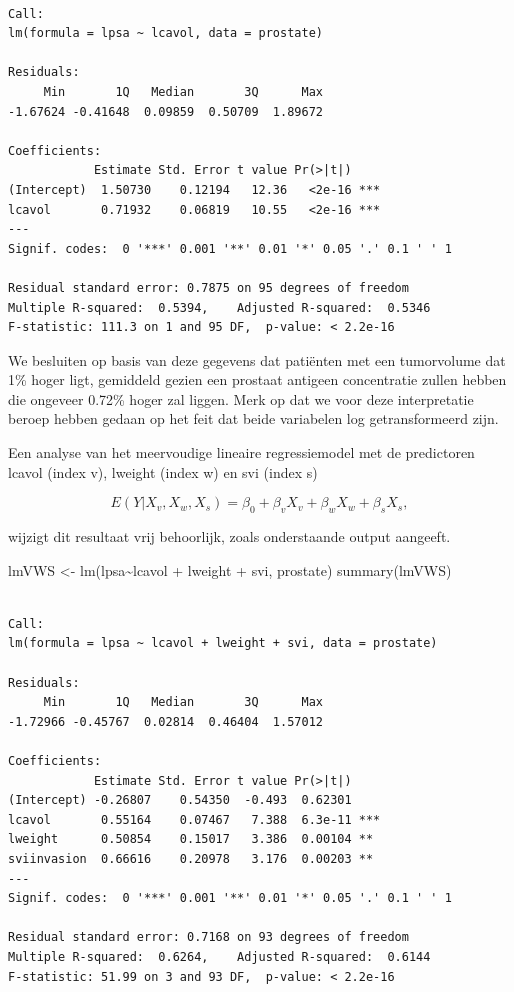\documentclass[
  dutch,
  letterpaper,
  12pt]{book}
\newenvironment{Shaded}{\begin{snugshade}}{\end{snugshade}}
\newcommand{\FunctionTok}[1]{\textcolor[rgb]{0.28,0.35,0.67}{#1}}
\newcommand{\NormalTok}[1]{\textcolor[rgb]{0.00,0.23,0.31}{#1}}
\newcommand{\OtherTok}[1]{\textcolor[rgb]{0.00,0.23,0.31}{#1}}
\newcommand{\SpecialCharTok}[1]{\textcolor[rgb]{0.37,0.37,0.37}{#1}}
\theoremstyle{definition}
\theoremstyle{definition}
\theoremstyle{definition}
\theoremstyle{remark}
\begin{document}
\begin{verbatim}

Call:
lm(formula = lpsa ~ lcavol, data = prostate)

Residuals:
     Min       1Q   Median       3Q      Max 
-1.67624 -0.41648  0.09859  0.50709  1.89672 

Coefficients:
            Estimate Std. Error t value Pr(>|t|)    
(Intercept)  1.50730    0.12194   12.36   <2e-16 ***
lcavol       0.71932    0.06819   10.55   <2e-16 ***
---
Signif. codes:  0 '***' 0.001 '**' 0.01 '*' 0.05 '.' 0.1 ' ' 1

Residual standard error: 0.7875 on 95 degrees of freedom
Multiple R-squared:  0.5394,    Adjusted R-squared:  0.5346 
F-statistic: 111.3 on 1 and 95 DF,  p-value: < 2.2e-16
\end{verbatim}

We besluiten op basis van deze gegevens dat patiënten met een
tumorvolume dat 1\% hoger ligt, gemiddeld gezien een prostaat antigeen
concentratie zullen hebben die ongeveer 0.72\% hoger zal liggen. Merk op
dat we voor deze interpretatie beroep hebben gedaan op het feit dat
beide variabelen log getransformeerd zijn.

Een analyse van het meervoudige lineaire regressiemodel met de
predictoren lcavol (index v), lweight (index w) en svi (index s)

\[
E(Y|X_v,X_w,X_s)=\beta_0 +\beta_v X_v+\beta_w X_w+\beta_s X_s,
\]

wijzigt dit resultaat vrij behoorlijk, zoals onderstaande output
aangeeft.

\begin{Shaded}
\begin{Highlighting}[]
\NormalTok{lmVWS }\OtherTok{\textless{}{-}} \FunctionTok{lm}\NormalTok{(lpsa}\SpecialCharTok{\textasciitilde{}}\NormalTok{lcavol }\SpecialCharTok{+}\NormalTok{ lweight }\SpecialCharTok{+}\NormalTok{ svi, prostate)}
\FunctionTok{summary}\NormalTok{(lmVWS)}
\end{Highlighting}
\end{Shaded}

\begin{verbatim}

Call:
lm(formula = lpsa ~ lcavol + lweight + svi, data = prostate)

Residuals:
     Min       1Q   Median       3Q      Max 
-1.72966 -0.45767  0.02814  0.46404  1.57012 

Coefficients:
            Estimate Std. Error t value Pr(>|t|)    
(Intercept) -0.26807    0.54350  -0.493  0.62301    
lcavol       0.55164    0.07467   7.388  6.3e-11 ***
lweight      0.50854    0.15017   3.386  0.00104 ** 
sviinvasion  0.66616    0.20978   3.176  0.00203 ** 
---
Signif. codes:  0 '***' 0.001 '**' 0.01 '*' 0.05 '.' 0.1 ' ' 1

Residual standard error: 0.7168 on 93 degrees of freedom
Multiple R-squared:  0.6264,    Adjusted R-squared:  0.6144 
F-statistic: 51.99 on 3 and 93 DF,  p-value: < 2.2e-16
\end{verbatim}
\end{document}
